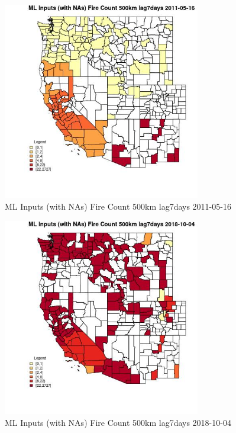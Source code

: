\begin{figure} 
\centering  
\includegraphics[width=0.77\textwidth]{Code_Outputs/Report_ML_input_PM25_Step4_part_f_de_duplicated_aves_prioritize_24hr_obswNAs_CountyFire_Count_500km_lag7daysMean2011-05-16.jpg} 
\caption{\label{fig:Report_ML_input_PM25_Step4_part_f_de_duplicated_aves_prioritize_24hr_obswNAsCountyFire_Count_500km_lag7daysMean2011-05-16}ML Inputs (with NAs) Fire Count 500km lag7days 2011-05-16} 
\end{figure} 
 

\clearpage 

\begin{figure} 
\centering  
\includegraphics[width=0.77\textwidth]{Code_Outputs/Report_ML_input_PM25_Step4_part_f_de_duplicated_aves_prioritize_24hr_obswNAs_CountyFire_Count_500km_lag7daysMean2018-10-04.jpg} 
\caption{\label{fig:Report_ML_input_PM25_Step4_part_f_de_duplicated_aves_prioritize_24hr_obswNAsCountyFire_Count_500km_lag7daysMean2018-10-04}ML Inputs (with NAs) Fire Count 500km lag7days 2018-10-04} 
\end{figure} 
 

